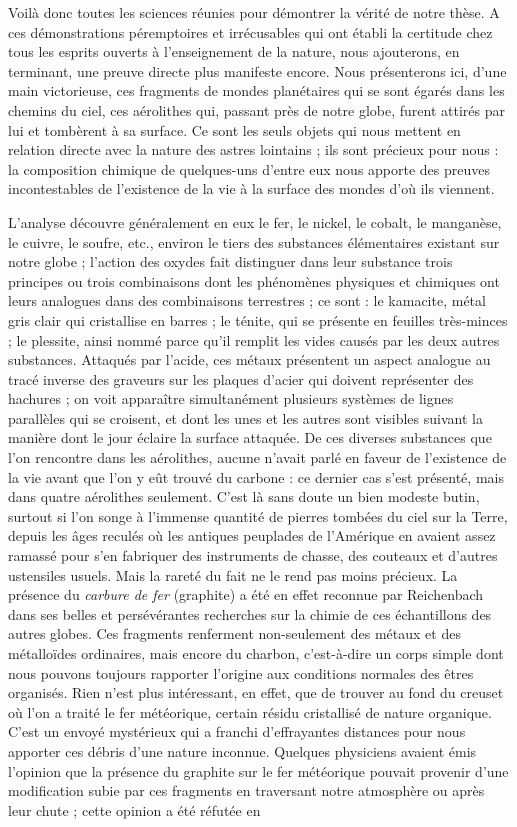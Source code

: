 \documentclass[a4paper, 11pt, oneside]{article}
\begin{document}
Voilà donc toutes les sciences réunies pour démontrer la vérité de notre thèse. A ces démonstrations péremptoires et irrécusables qui ont établi la certitude chez tous les esprits ouverts à l'enseignement de la nature, nous ajouterons, en terminant, une preuve directe plus manifeste encore. Nous présenterons ici, d'une main victorieuse, ces fragments de mondes planétaires qui se sont égarés dans les chemins du ciel, ces aérolithes qui, passant près de notre globe, furent attirés par lui et tombèrent à sa surface. Ce sont les seuls objets qui nous mettent en relation directe avec la nature des astres lointains ; ils sont précieux pour nous : la composition chimique de quelques-uns d'entre eux nous apporte des preuves incontestables de l'existence de la vie à la surface des mondes d'où ils viennent.

L'analyse découvre généralement en eux le fer, le nickel, le cobalt, le manganèse, le cuivre, le soufre, etc., environ le tiers des substances élémentaires existant sur notre globe ; l'action des oxydes fait distinguer dans leur substance trois principes ou trois combinaisons dont les phénomènes physiques et chimiques ont leurs analogues dans des combinaisons terrestres ; ce sont : le kamacite, métal gris clair qui cristallise en barres ; le ténite, qui se présente en feuilles très-minces ; le plessite, ainsi nommé parce qu'il remplit les vides causés par les deux autres substances. Attaqués par l'acide, ces métaux présentent un aspect analogue au tracé inverse des graveurs sur les plaques d'acier qui doivent représenter des hachures ; on voit apparaître simultanément plusieurs systèmes de lignes parallèles qui se croisent, et dont les unes et les autres sont visibles suivant la manière dont le jour éclaire la surface attaquée. De ces diverses substances que l'on rencontre dans les aérolithes, aucune n'avait parlé en faveur de l'existence de la vie avant que l'on y eût trouvé du carbone : ce dernier cas s'est présenté, mais dans quatre aérolithes seulement. C'est là sans doute un bien modeste butin, surtout si l'on songe à l'immense quantité de pierres tombées du ciel sur la Terre, depuis les âges reculés où les antiques peuplades de l'Amérique en avaient assez ramassé pour s'en fabriquer des instruments de chasse, des couteaux et d'autres ustensiles usuels. Mais la rareté du fait ne le rend pas moins précieux. La présence du \emph{carbure de fer} (graphite) a été en effet reconnue par Reichenbach dans ses belles et persévérantes recherches sur la chimie de ces échantillons des autres globes. Ces fragments renferment non-seulement des métaux et des métalloïdes ordinaires, mais encore du charbon, c'est-à-dire un corps simple dont nous pouvons toujours rapporter l'origine aux conditions normales des êtres organisés. Rien n'est plus intéressant, en effet, que de trouver au fond du creuset où l'on a traité le fer météorique, certain résidu cristallisé de nature organique. C'est un envoyé mystérieux qui a franchi d'effrayantes distances pour nous apporter ces débris d'une nature inconnue. Quelques physiciens avaient émis l'opinion que la présence du graphite sur le fer météorique pouvait provenir d'une modification subie par ces fragments en traversant notre atmosphère ou après leur chute ; cette opinion a été réfutée en 
\end{document}

